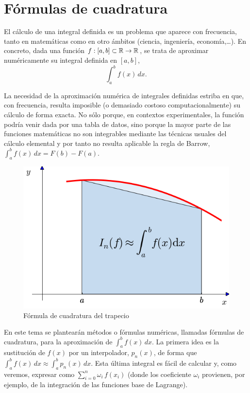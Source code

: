 \newcommand{\ox}{\overline x}

\section{Fórmulas de cuadratura}
\label{sect:form-de-cuadratura}



El cálculo de una integral definida es un problema que aparece con
frecuencia, tanto en matemáticas como en otro ámbitos (ciencia,
ingeniería, economía,\dots). En concreto, dada una función
$f:[a,b]\subset\operatorname{{\mathbb R}}\to\operatorname{{\mathbb R}}$, se trata de aproximar numéricamente su
integral definida en $[a,b]$,
\begin{equation*}
  \int_a^b f(x)\,dx.
\end{equation*}

La necesidad de la aproximación numérica de integrales definidas
estriba en que, con frecuencia, resulta imposible (o demasiado costoso
computacionalmente) su cálculo de forma exacta. No sólo porque, en
contextos experimentales, la función podría venir dada por una tabla
de datos, sino porque la mayor parte de las funciones matemáticas no
son integrables mediante las técnicas usuales del cálculo elemental
y por tanto no resulta aplicable la regla de Barrow, $\int_a^b f(x)\,
dx=F(b)-F(a)$.

\begin{figure}
  \centering
    \includegraphics[width=0.5\linewidth]{tema3/fc-trapecio}
  \caption{Fórmula de cuadratura del trapecio}
  \label{fig:fc-trapecio}
\end{figure}
En este tema se plantearán métodos o fórmulas numéricas, llamadas
fórmulas de cuadratura, para la aproximación de $\int_a^b f(x)\,
dx$. La primera idea es la sustitución de $f(x)$ por un interpolador,
$p_n(x)$, de forma que $\int_a^bf(x)\,dx \approx \int_a^b p_n(x)\,
dx$. Esta última integral es fácil de calcular y, como veremos,
expresar como $\sum_{i=0}^n \omega_i \, f(x_i)$ (donde los coeficiente
$\omega_i$ provienen, por ejemplo, de la integración de las
funciones base de Lagrange).


